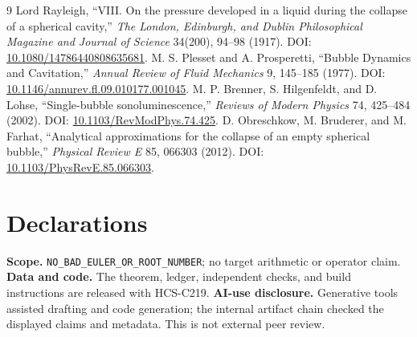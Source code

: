 \documentclass[11pt]{article}
\begin{document}
\begin{thebibliography}{9}
 Lord Rayleigh, ``VIII. On the pressure developed in a
liquid during the collapse of a spherical cavity,'' \emph{The London,
Edinburgh, and Dublin Philosophical Magazine and Journal of Science} 34(200),
94--98 (1917). DOI: \href{https://doi.org/10.1080/14786440808635681}{10.1080/14786440808635681}.
 M. S. Plesset and A. Prosperetti, ``Bubble Dynamics and
Cavitation,'' \emph{Annual Review of Fluid Mechanics} 9, 145--185 (1977).
DOI: \href{https://doi.org/10.1146/annurev.fl.09.010177.001045}{10.1146/annurev.fl.09.010177.001045}.
 M. P. Brenner, S. Hilgenfeldt, and D. Lohse,
``Single-bubble sonoluminescence,'' \emph{Reviews of Modern Physics} 74,
425--484 (2002). DOI: \href{https://doi.org/10.1103/RevModPhys.74.425}{10.1103/RevModPhys.74.425}.
 D. Obreschkow, M. Bruderer, and M. Farhat,
``Analytical approximations for the collapse of an empty spherical bubble,''
\emph{Physical Review E} 85, 066303 (2012). DOI:
\href{https://doi.org/10.1103/PhysRevE.85.066303}{10.1103/PhysRevE.85.066303}.
\end{thebibliography}

\section*{Declarations}
\textbf{Scope.} \texttt{NO\_BAD\_EULER\_OR\_ROOT\_NUMBER}; no target arithmetic
or operator claim.  \textbf{Data and code.} The theorem, ledger, independent
checks, and build instructions are released with HCS-C219.
\textbf{AI-use disclosure.} Generative tools assisted drafting and code
generation; the internal artifact chain checked the displayed claims and
metadata.  This is not external peer review.
\end{document}
